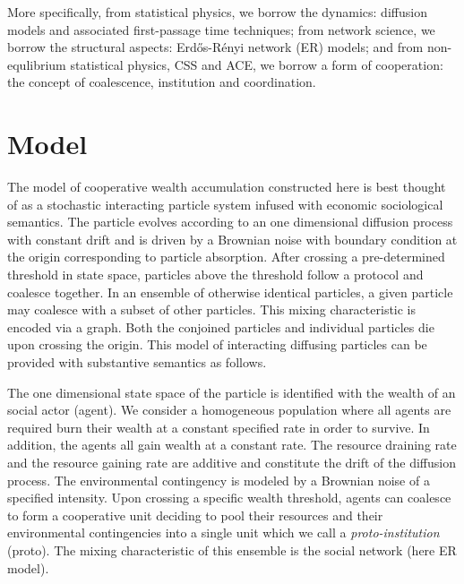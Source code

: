 \documentclass[sigconf]{acmart}
\begin{document}
More specifically, from statistical physics, we borrow the dynamics: diffusion models and associated first-passage time techniques; from network science, we borrow the structural aspects: Erd\H{o}s-R\'{e}nyi network (ER) models; and from non-equlibrium statistical physics, CSS and ACE, we borrow a form of cooperation: the concept of coalescence, institution and coordination. 



\section{Model}
The model of cooperative wealth accumulation constructed here is best thought of as a stochastic interacting particle system infused with economic sociological semantics. The particle evolves according to an one dimensional diffusion process with constant drift and is driven by a Brownian noise with boundary condition at the origin corresponding to particle absorption. After crossing a pre-determined threshold in state space, particles above the threshold follow a protocol and coalesce together. In an ensemble of otherwise identical particles, a given particle may coalesce with a subset of other particles. This mixing characteristic is encoded via a graph. Both the conjoined particles and individual particles die upon crossing the origin. This model of interacting diffusing particles can be provided with substantive semantics as follows. 

The one dimensional state space of the particle is identified with the wealth of an social actor (agent). We consider a homogeneous population where all agents are required burn their wealth at a constant specified rate in order to survive. In addition, the agents all gain wealth at a constant rate. The resource draining rate and the resource gaining rate are additive and constitute the drift of the diffusion process. The environmental contingency is modeled by a Brownian noise of a specified intensity. Upon crossing a specific wealth threshold, agents can coalesce to form a cooperative unit deciding to pool their resources and their environmental contingencies into a single unit which we call a \textit{proto-institution} (proto). The mixing characteristic of this ensemble is the social network (here ER model).          



~\cite{redner2001guide} ~\cite{rv}  ~\cite{wilhite} ~\cite{arthur} 
\end{document}
